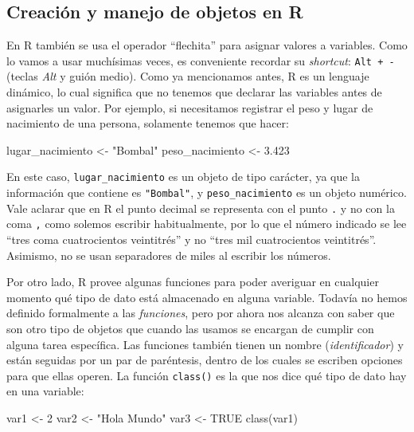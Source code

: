 \documentclass[
]{book}
\newenvironment{Shaded}{\begin{snugshade}}{\end{snugshade}}
\newcommand{\ConstantTok}[1]{\textcolor[rgb]{0.00,0.00,0.00}{#1}}
\newcommand{\DecValTok}[1]{\textcolor[rgb]{0.00,0.00,0.81}{#1}}
\newcommand{\FunctionTok}[1]{\textcolor[rgb]{0.00,0.00,0.00}{#1}}
\newcommand{\NormalTok}[1]{#1}
\newcommand{\OtherTok}[1]{\textcolor[rgb]{0.56,0.35,0.01}{#1}}
\newcommand{\StringTok}[1]{\textcolor[rgb]{0.31,0.60,0.02}{#1}}
\begin{document}
\hypertarget{objetosenR}{%
\subsection{Creación y manejo de objetos en R}\label{objetosenR}}

En R también se usa el operador ``flechita'' para asignar valores a variables. Como lo vamos a usar muchísimas veces, es conveniente recordar su \emph{shortcut}: \texttt{Alt\ +\ -} (teclas \emph{Alt} y guión medio). Como ya mencionamos antes, R es un lenguaje dinámico, lo cual significa que no tenemos que declarar las variables antes de asignarles un valor. Por ejemplo, si necesitamos registrar el peso y lugar de nacimiento de una persona, solamente tenemos que hacer:

\begin{Shaded}
\begin{Highlighting}[]
\NormalTok{lugar\_nacimiento \textless{}{-} "Bombal"}
\NormalTok{peso\_nacimiento \textless{}{-} 3.423}
\end{Highlighting}
\end{Shaded}

En este caso, \texttt{lugar\_nacimiento} es un objeto de tipo carácter, ya que la información que contiene es \texttt{"Bombal"}, y \texttt{peso\_nacimiento} es un objeto numérico. Vale aclarar que en R el punto decimal se representa con el punto \texttt{.} y no con la coma \texttt{,} como solemos escribir habitualmente, por lo que el número indicado se lee ``tres coma cuatrocientos veintitrés'' y no ``tres mil cuatrocientos veintitrés''. Asimismo, no se usan separadores de miles al escribir los números.

Por otro lado, R provee algunas funciones para poder averiguar en cualquier momento qué tipo de dato está almacenado en alguna variable. Todavía no hemos definido formalmente a las \emph{funciones}, pero por ahora nos alcanza con saber que son otro tipo de objetos que cuando las usamos se encargan de cumplir con alguna tarea específica. Las funciones también tienen un nombre (\emph{identificador}) y están seguidas por un par de paréntesis, dentro de los cuales se escriben opciones para que ellas operen. La función \texttt{class()} es la que nos dice qué tipo de dato hay en una variable:

\begin{Shaded}
\begin{Highlighting}[]
\NormalTok{var1 }\OtherTok{\textless{}{-}} \DecValTok{2}
\NormalTok{var2 }\OtherTok{\textless{}{-}} \StringTok{"Hola Mundo"}
\NormalTok{var3 }\OtherTok{\textless{}{-}} \ConstantTok{TRUE}
\FunctionTok{class}\NormalTok{(var1)}
\end{Highlighting}
\end{Shaded}
\end{document}

